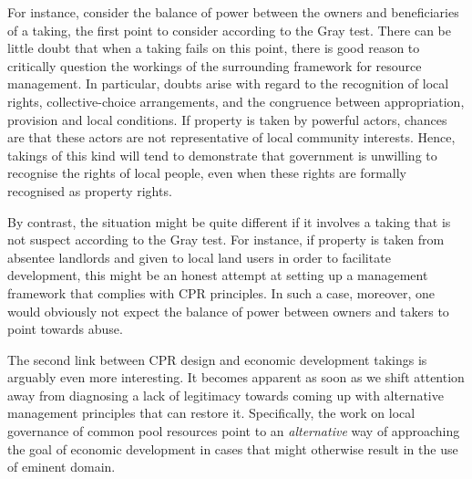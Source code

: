For instance, consider the balance of power between the owners and beneficiaries of a taking, the first point to consider according to the Gray test. There can be little doubt that when a taking fails on this point, there is good reason to critically question the workings of the surrounding framework for resource management. In particular, doubts arise with regard to the recognition of local rights, collective-choice arrangements, and the congruence between appropriation, provision and local conditions. If property is taken by powerful actors, chances are that these actors are not representative of local community interests. Hence, takings of this kind will tend to demonstrate that government is unwilling to recognise the rights of local people, even when these rights are formally recognised as property rights.

By contrast, the situation might be quite different if it involves a taking that is not suspect according to the Gray test. For instance, if property is taken from absentee landlords and given to local land users in order to facilitate development, this might be an honest attempt at setting up a management framework that complies with CPR principles. In such a case, moreover, one would obviously not expect the balance of power between owners and takers to point towards abuse.


The second link between CPR design and economic development takings is arguably even more interesting. It becomes apparent as soon as we shift attention away from diagnosing a lack of legitimacy towards coming up with alternative management principles that can restore it. Specifically, the work on local governance of common pool resources point to an {\it alternative} way of approaching the goal of economic development in cases that might otherwise result in the use of eminent domain. 

